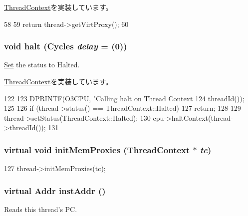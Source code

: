 \hyperlink{classThreadContext_a55e3a4b93d5f1ad641247f6d223191c6}{ThreadContext}を実装しています。


\begin{DoxyCode}
58 {
59     return thread->getVirtProxy();
60 }
\end{DoxyCode}
\hypertarget{classO3ThreadContext_ade40686c5cdae8911d4062b9bf3d5340}{
\subsubsection[{halt}]{\setlength{\rightskip}{0pt plus 5cm}void halt ({\bf Cycles} {\em delay} = {(0)})}}
\label{classO3ThreadContext_ade40686c5cdae8911d4062b9bf3d5340}
\hyperlink{classSet}{Set} the status to Halted. 

\hyperlink{classThreadContext_a1cf6e868fcd49300a04acd0cae4fd142}{ThreadContext}を実装しています。


\begin{DoxyCode}
122 {
123     DPRINTF(O3CPU, "Calling halt on Thread Context %
124             threadId());
125 
126     if (thread->status() == ThreadContext::Halted)
127         return;
128 
129     thread->setStatus(ThreadContext::Halted);
130     cpu->haltContext(thread->threadId());
131 }
\end{DoxyCode}
\hypertarget{classO3ThreadContext_a2d4bc0eb5db970fb1647344ef772de61}{
\subsubsection[{initMemProxies}]{\setlength{\rightskip}{0pt plus 5cm}virtual void initMemProxies ({\bf ThreadContext} $\ast$ {\em tc})}}
\label{classO3ThreadContext_a2d4bc0eb5db970fb1647344ef772de61}



\begin{DoxyCode}
127     { thread->initMemProxies(tc); }
\end{DoxyCode}
\hypertarget{classO3ThreadContext_a6b3010be20c1be74148cde2913b3f7c3}{
\subsubsection[{instAddr}]{\setlength{\rightskip}{0pt plus 5cm}virtual {\bf Addr} instAddr ()}}
\label{classO3ThreadContext_a6b3010be20c1be74148cde2913b3f7c3}
Reads this thread's PC. 

